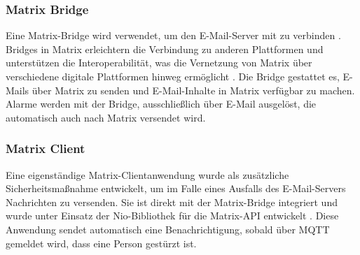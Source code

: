 \subsubsection{Matrix Bridge}
Eine Matrix-Bridge wird verwendet, um den E-Mail-Server mit  zu verbinden \cite{jojii_jojiiofficialmatrix-emailbridge_2024}. Bridges in Matrix erleichtern die Verbindung zu anderen Plattformen und unterstützen die Interoperabilität, was die Vernetzung von Matrix über verschiedene digitale Plattformen hinweg ermöglicht \cite{noauthor_bridges_nodate}. Die Bridge gestattet es, E-Mails über Matrix zu senden und E-Mail-Inhalte in Matrix verfügbar zu machen. Alarme werden mit der Bridge, ausschließlich über E-Mail ausgelöst, die automatisch auch nach Matrix versendet wird.


\subsubsection{Matrix Client}
Eine eigenständige Matrix-Clientanwendung wurde als zusätzliche Sicherheitsmaßnahme entwickelt, um im Falle eines Ausfalls des E-Mail-Servers Nachrichten zu versenden. Sie ist direkt mit der Matrix-Bridge integriert und wurde unter Einsatz der Nio-Bibliothek für die Matrix-API entwickelt \cite{nio}. Diese Anwendung sendet automatisch eine Benachrichtigung, sobald über MQTT gemeldet wird, dass eine Person gestürzt ist.